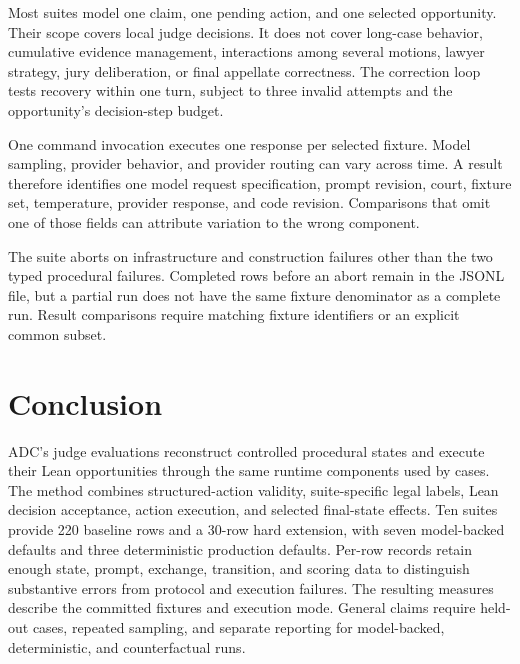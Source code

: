 \documentclass[11pt]{article}
\begin{document}
Most suites model one claim, one pending action, and one selected opportunity.  Their scope covers local judge decisions.  It does not cover long-case behavior, cumulative evidence management, interactions among several motions, lawyer strategy, jury deliberation, or final appellate correctness.  The correction loop tests recovery within one turn, subject to three invalid attempts and the opportunity's decision-step budget.

One command invocation executes one response per selected fixture.  Model sampling, provider behavior, and provider routing can vary across time.  A result therefore identifies one model request specification, prompt revision, court, fixture set, temperature, provider response, and code revision.  Comparisons that omit one of those fields can attribute variation to the wrong component.

The suite aborts on infrastructure and construction failures other than the two typed procedural failures.  Completed rows before an abort remain in the JSONL file, but a partial run does not have the same fixture denominator as a complete run.  Result comparisons require matching fixture identifiers or an explicit common subset.

\section{Conclusion}

ADC's judge evaluations reconstruct controlled procedural states and execute their Lean opportunities through the same runtime components used by cases.  The method combines structured-action validity, suite-specific legal labels, Lean decision acceptance, action execution, and selected final-state effects.  Ten suites provide 220 baseline rows and a 30-row hard extension, with seven model-backed defaults and three deterministic production defaults.  Per-row records retain enough state, prompt, exchange, transition, and scoring data to distinguish substantive errors from protocol and execution failures.  The resulting measures describe the committed fixtures and execution mode.  General claims require held-out cases, repeated sampling, and separate reporting for model-backed, deterministic, and counterfactual runs.
\end{document}
